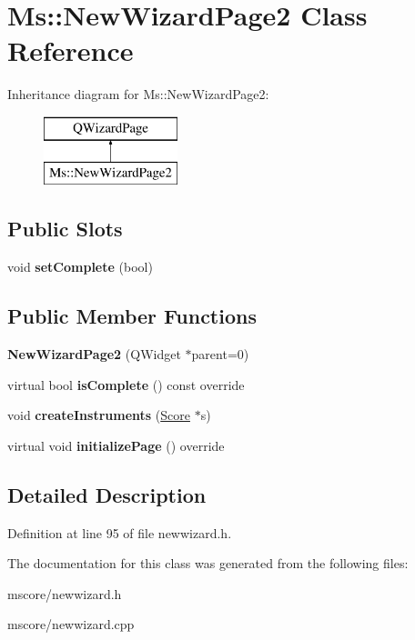 \hypertarget{class_ms_1_1_new_wizard_page2}{}\section{Ms\+:\+:New\+Wizard\+Page2 Class Reference}
\label{class_ms_1_1_new_wizard_page2}
Inheritance diagram for Ms\+:\+:New\+Wizard\+Page2\+:\begin{figure}[H]
\begin{center}
\leavevmode
\includegraphics[height=2.000000cm]{class_ms_1_1_new_wizard_page2}
\end{center}
\end{figure}
\subsection*{Public Slots}
\begin{DoxyCompactItemize}
\item 
\mbox{\label{class_ms_1_1_new_wizard_page2_a33c7f1bf0bee9d668541787d2f975e78}} 
void {\bfseries set\+Complete} (bool)
\end{DoxyCompactItemize}
\subsection*{Public Member Functions}
\begin{DoxyCompactItemize}
\item 
\mbox{\label{class_ms_1_1_new_wizard_page2_af82ca5a90a224a8193ee628907b2cca2}} 
{\bfseries New\+Wizard\+Page2} (Q\+Widget $\ast$parent=0)
\item 
\mbox{\label{class_ms_1_1_new_wizard_page2_a3903bf7c56444dfb851a867778e5c121}} 
virtual bool {\bfseries is\+Complete} () const override
\item 
\mbox{\label{class_ms_1_1_new_wizard_page2_a862d12c4064b74e61b8bb8aee8b60485}} 
void {\bfseries create\+Instruments} (\hyperlink{class_ms_1_1_score}{Score} $\ast$s)
\item 
\mbox{\label{class_ms_1_1_new_wizard_page2_a33e113b470c3aa1d809eade6dbd989db}} 
virtual void {\bfseries initialize\+Page} () override
\end{DoxyCompactItemize}


\subsection{Detailed Description}


Definition at line 95 of file newwizard.\+h.



The documentation for this class was generated from the following files\+:\begin{DoxyCompactItemize}
\item 
mscore/newwizard.\+h\item 
mscore/newwizard.\+cpp\end{DoxyCompactItemize}
